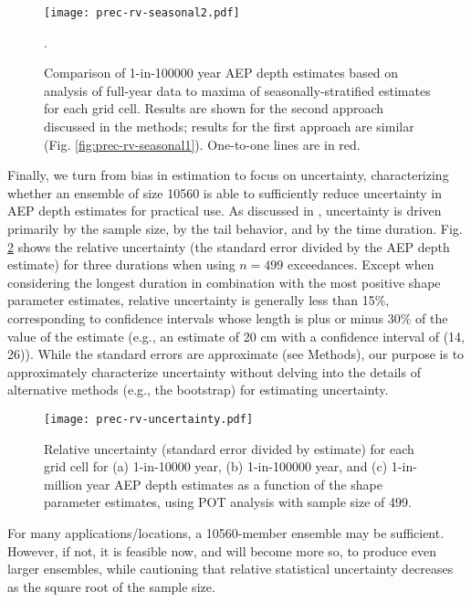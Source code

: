 \documentclass{ametsocV6.1}
\begin{document}
\begin{figure}
    \centering
    \texttt{[image: prec-rv-seasonal2.pdf]}
    \caption{Comparison of 1-in-100000 year AEP depth estimates based on analysis of full-year data to maxima of seasonally-stratified estimates for each grid cell. Results are shown for the second approach discussed in the methods; results for the first approach are similar (Fig. \ref{fig:prec-rv-seasonal1}). One-to-one lines are in red.}.
    \label{fig:prec-rv-seasonal2}
\end{figure}


Finally, we turn from bias in estimation to focus on uncertainty, characterizing whether an ensemble of size 10560 is able to sufficiently reduce uncertainty in AEP depth estimates for practical use. As discussed in \citet{nasem2024pmp}, uncertainty is driven primarily by the sample size, by the tail behavior, and by the time duration. Fig. \ref{fig:prec-rv-uncertainty} shows the relative uncertainty (the standard error divided by the AEP depth estimate) for three durations when using $n=499$ exceedances. Except when considering the longest duration in combination with the most positive shape parameter estimates, relative uncertainty is generally less than 15\%, corresponding to confidence intervals whose length is plus or minus 30\% of the value of the estimate (e.g., an estimate of 20 cm with a confidence interval of (14, 26)). While the standard errors are approximate (see Methods), our purpose is to approximately characterize uncertainty without delving into the details of alternative methods (e.g., the bootstrap) for estimating uncertainty. 


  
\begin{figure}
    \centering
    \texttt{[image: prec-rv-uncertainty.pdf]}
    \caption{Relative uncertainty (standard error divided by estimate) for each grid cell for (a) 1-in-10000 year, (b) 1-in-100000 year, and (c) 1-in-million year AEP depth estimates as a function of the shape parameter estimates, using POT analysis with sample size of 499.}
    \label{fig:prec-rv-uncertainty}
\end{figure}

For many applications/locations, a 10560-member ensemble may be sufficient. However, if not, it is feasible now, and will become more so, to produce even larger ensembles, while cautioning that relative statistical uncertainty decreases as the square root of the sample size.
\end{document}
